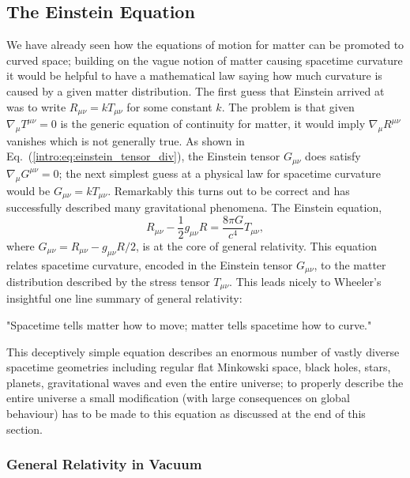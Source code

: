 \subsection{The Einstein Equation}
We have already seen how the equations of motion for matter can be promoted to curved space; building on the vague notion of matter causing spacetime curvature it would be helpful to have a mathematical law saying how much curvature is caused by a given matter distribution. The first guess that Einstein arrived at was to write $R_{\mu\nu}=kT_{\mu\nu}$ for some constant $k$. The problem is that given $\nabla_\mu T^{\mu\nu}=0$ is the generic equation of continuity for matter, it would imply $\nabla_\mu R^{\mu\nu}$ vanishes which is not generally true. As shown in Eq.~(\ref{intro:eq:einstein_tensor_div}), the Einstein tensor $G_{\mu\nu}$ does satisfy $\nabla_\mu G^{\mu\nu}=0$; the next simplest guess at a physical law for spacetime curvature would be $G_{\mu\nu} = k T_{\mu\nu}$. Remarkably this turns out to be correct and has successfully described many gravitational phenomena. The Einstein equation,
\begin{equation}\label{intro:eq:einstein}
R_{\mu\nu} - \frac{1}{2}g_{\mu\nu}R = \frac{8 \pi G}{c^4}T_{\mu\nu},
\end{equation}
where $G_{\mu\nu} = R_{\mu\nu}- g_{\mu\nu}R/2$, is at the core of general relativity. This equation relates spacetime curvature, encoded in the Einstein tensor $G_{\mu\nu}$, to the matter distribution described by the stress tensor $T_{\mu\nu}$. This leads nicely to Wheeler's insightful one line summary of general relativity: 

{\it \begin{center}{"Spacetime tells matter how to move; matter tells spacetime how to curve."}\end{center} } 

This deceptively simple equation \color{orchid} describes an enormous number \color{black} of vastly diverse spacetime geometries including regular flat Minkowski space, black holes, stars, planets, gravitational waves and even the entire universe; to properly describe the entire universe a small modification \color{orchid} (with large consequences on global behaviour) \color{black} has to be made to this equation as discussed at the end of this section. 



\subsubsection*{General Relativity in Vacuum}

